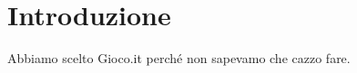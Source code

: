 \documentclass[../Report.tex]{subfiles}
\begin{document}
    \chapter*{Introduzione}
    Abbiamo scelto Gioco.it perché non sapevamo che cazzo fare.
\end{document}
